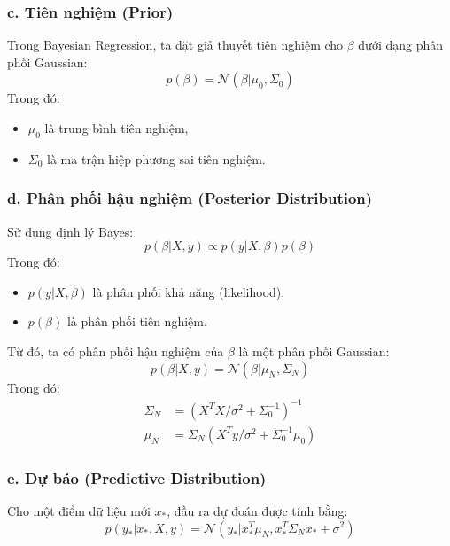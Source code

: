 \subsubsection{c. Tiên nghiệm (Prior)}
Trong Bayesian Regression, ta đặt giả thuyết tiên nghiệm cho $\beta$ dưới dạng phân phối Gaussian:
\begin{equation}
    p(\beta) = \mathcal{N}(\beta | \mu_0, \Sigma_0)
\end{equation}
Trong đó:
\begin{itemize}
    \item $\mu_0$ là trung bình tiên nghiệm,
    \item $\Sigma_0$ là ma trận hiệp phương sai tiên nghiệm.
\end{itemize}

\subsubsection{d. Phân phối hậu nghiệm (Posterior Distribution)}
Sử dụng định lý Bayes:
\begin{equation}
    p(\beta | X, y) \propto p(y | X, \beta) p(\beta)
\end{equation}
Trong đó:
\begin{itemize}
    \item $p(y | X, \beta)$ là phân phối khả năng (likelihood),
    \item $p(\beta)$ là phân phối tiên nghiệm.
\end{itemize}
Từ đó, ta có phân phối hậu nghiệm của $\beta$ là một phân phối Gaussian:
\begin{equation}
    p(\beta | X, y) = \mathcal{N}(\beta | \mu_N, \Sigma_N)
\end{equation}
Trong đó:
\begin{align}
    \Sigma_N &= (X^T X / \sigma^2 + \Sigma_0^{-1})^{-1} \\
    \mu_N &= \Sigma_N (X^T y / \sigma^2 + \Sigma_0^{-1} \mu_0)
\end{align}

\subsubsection{e. Dự báo (Predictive Distribution)}
Cho một điểm dữ liệu mới $x_*$, đầu ra dự đoán được tính bằng:
\begin{equation}
    p(y_* | x_*, X, y) = \mathcal{N}(y_* | x_*^T \mu_N, x_*^T \Sigma_N x_* + \sigma^2)
\end{equation}

